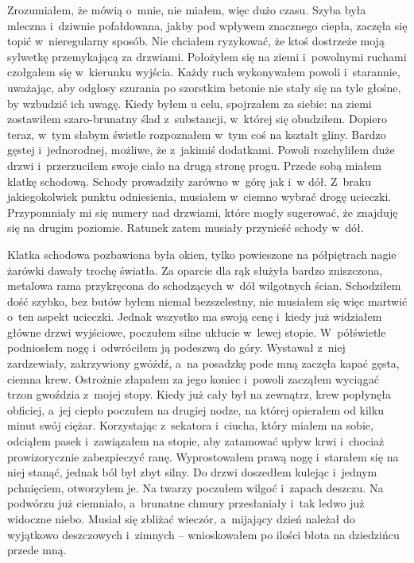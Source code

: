 Zrozumiałem, że mówią o~mnie, nie miałem, więc dużo czasu. Szyba była mleczna i~dziwnie pofałdowana, jakby pod wpływem znacznego ciepła, zaczęła się topić w~nieregularny sposób. Nie chciałem ryzykować, że ktoś dostrzeże moją sylwetkę przemykającą za drzwiami. Położyłem się na ziemi i~powolnymi ruchami czołgałem się w~kierunku wyjścia. Każdy ruch wykonywałem powoli i~starannie, uważając, aby odgłosy szurania po szorstkim betonie nie stały się na tyle głośne, by wzbudzić ich uwagę. Kiedy byłem u celu, spojrzałem za siebie: na ziemi zostawiłem szaro-brunatny ślad z~substancji, w~której się obudziłem. Dopiero teraz, w~tym słabym świetle rozpoznałem w~tym coś na kształt gliny. Bardzo gęstej i~jednorodnej, możliwe, że z~jakimiś dodatkami. Powoli rozchyliłem duże drzwi i~przerzuciłem swoje ciało na drugą stronę progu. Przede sobą miałem klatkę schodową. Schody prowadziły zarówno w~górę jak i~w dół. Z~braku jakiegokolwiek punktu odniesienia, musiałem w~ciemno wybrać drogę ucieczki. Przypomniały mi się numery nad drzwiami, które mogły sugerować, że znajduję się na drugim poziomie. Ratunek zatem musiały przynieść schody w~dół.

Klatka schodowa pozbawiona była okien, tylko powieszone na półpiętrach nagie żarówki dawały trochę światła. Za oparcie dla rąk służyła bardzo zniszczona, metalowa rama przykręcona do schodzących w~dół wilgotnych ścian. Schodziłem dość szybko, bez butów byłem niemal bezszelestny, nie musiałem się więc martwić o~ten aspekt ucieczki. Jednak wszystko ma swoją cenę i~kiedy już widziałem główne drzwi wyjściowe, poczułem silne ukłucie w~lewej stopie. W~półświetle podniosłem nogę i~odwróciłem ją podeszwą do góry. Wystawał z~niej zardzewiały, zakrzywiony gwóźdź, a~na posadzkę pode mną zaczęła kapać gęsta, ciemna krew. Ostrożnie złapałem za jego koniec i~powoli zacząłem wyciągać trzon gwoździa z~mojej stopy. Kiedy już cały był na zewnątrz, krew popłynęła obficiej, a~jej ciepło poczułem na drugiej nodze, na której opierałem od kilku minut swój ciężar. Korzystając z~sekatora i~ciucha, który miałem na sobie, odciąłem pasek i~zawiązałem na stopie, aby zatamować upływ krwi i~chociaż prowizorycznie zabezpieczyć ranę. Wyprostowałem prawą nogę i~starałem się na niej stanąć, jednak ból był zbyt silny. Do drzwi doszedłem kulejąc i~jednym pchnięciem, otworzyłem je. Na twarzy poczułem wilgoć i~zapach deszczu. Na podwórzu już ciemniało, a~brunatne chmury przesłaniały i~tak ledwo już widoczne niebo. Musiał się zbliżać wieczór, a~mijający dzień należał do wyjątkowo deszczowych i~zimnych -- wnioskowałem po ilości błota na dziedzińcu przede mną.

